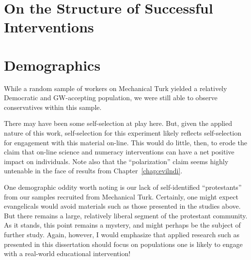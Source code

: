 \section{On the Structure of Successful Interventions}


% 
 
\section{Demographics}

While a random sample of workers on Mechanical Turk yielded a relatively
Democratic and GW-accepting population, we were still able to observe
conservatives within this sample.

There may have been some self-selection at play here. But, given the applied
nature of this work, self-selection for this experiment likely reflects
self-selection for engagement with this material on-line. This would do little,
then, to erode the claim that on-line science and numeracy interventions can
have a net positive impact on individuals. Note also that the “polarization”
claim seems highly untenable in the face of results from
Chapter~\ref{chap:evilndi}.

One demographic oddity worth noting is our lack of self-identified “protestants”
from our samples recruited from Mechanical Turk. Certainly, one might expect
evangelicals would avoid materials such as those presented in the studies above.
But there remains a large, relatively liberal segment of the protestant
community. As it stands, this point remains a mystery, and might perhaps be the
subject of further study. Again, however, I would emphasize that applied
research such as presented in this dissertation should focus on populations one
is likely to engage with a real-world educational intervention!

